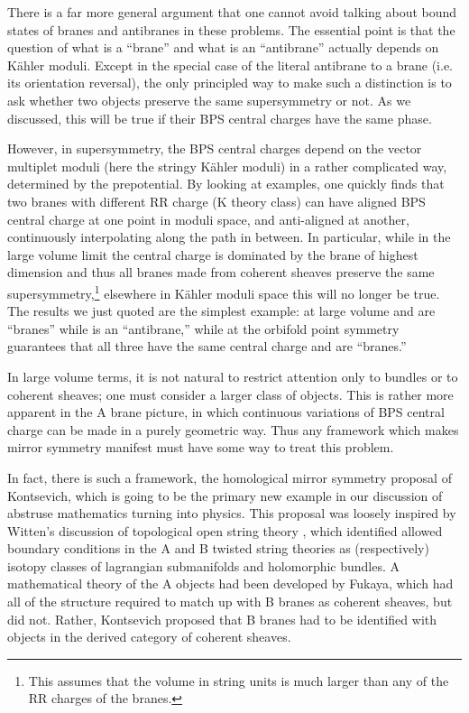 \documentclass[a4paper,12pt]{amsart}
\numberwithin{equation}{section}
\theoremstyle{plain}
\theoremstyle{definition}
\def\Bbb#1{{\fam\black\relax#1}}
\def\Bbb{\bf}
\def\cal{\mathcal}
\def\BC{\Bbb{C}}
\def\BZ{\Bbb{Z}}
\def\CN{{\cal N}}
\begin{document}
There is a far more general argument that one cannot avoid talking
about bound states of branes and antibranes in these problems.  The
essential point is that the question of what is a ``brane'' and what
is an ``antibrane'' actually depends on K\"ahler moduli.  Except in
the special case of the literal antibrane \coordHE{} to a brane \coordHE{}
(i.e. its orientation reversal), the only principled way to make such
a distinction is to ask whether two objects preserve the same \myHighlight{$\CN=1$}\coordHE{}
supersymmetry or not.  As we discussed, this will be true if their BPS
central charges have the same phase.

However, in \myHighlight{$\CN=2$}\coordHE{} supersymmetry, the BPS central charges depend on
the vector multiplet moduli (here the stringy K\"ahler moduli) in a
rather complicated way, determined by the \myHighlight{$\CN=2$}\coordHE{} prepotential.  By
looking at examples, one quickly finds that two branes with different
RR charge (K theory class) can have aligned BPS central charge at one
point in moduli space, and anti-aligned at another, continuously
interpolating along the path in between.  In particular, while in the
large volume limit the central charge is dominated by the brane of
highest dimension and thus all branes made from coherent sheaves
preserve the same \myHighlight{$\CN=1$}\coordHE{} supersymmetry,\footnote{ This assumes that
the volume in string units is much larger than any of the RR charges
of the branes.} elsewhere in K\"ahler moduli space this will no longer
be true.  The \myHighlight{$\BC^3/\BZ_3$}\coordHE{} results we just quoted are the simplest
example: at large volume \coordHE{} and \coordHE{} are ``branes'' while \coordHE{} is
an ``antibrane,'' while at the orbifold point \myHighlight{$\BZ_3$}\coordHE{} symmetry
guarantees that all three have the same central charge and are
``branes.''

In large volume terms, it is not natural to restrict attention only to
bundles or to coherent sheaves; one must consider a larger class of
objects.  This is rather more apparent in the A brane picture, in
which continuous variations of BPS central charge can be made in a
purely geometric way.  Thus any framework which makes mirror symmetry
manifest must have some way to treat this problem.

In fact, there is such a framework, the homological mirror symmetry
proposal of Kontsevich, which is going to be the primary new example
in our discussion of abstruse mathematics turning into physics.  This
proposal was loosely inspired by Witten's discussion of topological
open string theory \cite{Witten-top}, which identified allowed
boundary conditions in the A and B twisted string theories as
(respectively) isotopy classes of lagrangian submanifolds and
holomorphic bundles.  A mathematical theory of the A objects had been
developed by Fukaya, which had all of the structure required to match
up with B branes as coherent sheaves, but did not.  Rather, Kontsevich
proposed that B branes had to be identified with objects in the
derived category of coherent sheaves.
\end{document}
